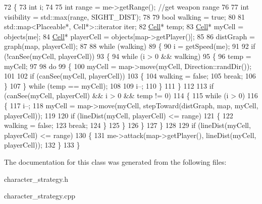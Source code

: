 \begin{DoxyCode}
72 \{
73     \textcolor{keywordtype}{int} i;
74 
75     \textcolor{keywordtype}{int} range = me->getRange(); \textcolor{comment}{//get weapon range}
76 
77     \textcolor{keywordtype}{int} visibility = std::max(range, SIGHT\_DIST);
78 
79     \textcolor{keywordtype}{bool} walking = \textcolor{keyword}{true};
80 
81     std::map<Placeable*, Cell*>::iterator iter;
82     \hyperlink{class_cell}{Cell}* temp;
83     \hyperlink{class_cell}{Cell}* myCell = objects[me];
84     \hyperlink{class_cell}{Cell}* playerCell = objects[map->getPlayer()];
85 
86     distGraph = graph(map, playerCell);
87 
88     \textcolor{keywordflow}{while} (walking)
89     \{
90         i = getSpeed(me);
91 
92         \textcolor{keywordflow}{if} (!canSee(myCell, playerCell))
93         \{
94             \textcolor{keywordflow}{while} (i > 0 && walking)
95             \{
96                 temp = myCell;
97 
98                 \textcolor{keywordflow}{do}
99                 \{
100                     myCell = map->move(myCell, Direction::randDir());
101 
102                     \textcolor{keywordflow}{if} (canSee(myCell, playerCell))
103                     \{
104                         walking = \textcolor{keyword}{false};
105                         \textcolor{keywordflow}{break};
106                     \}
107                 \} \textcolor{keywordflow}{while} (temp == myCell);
108 
109                 i--;
110             \}
111         \}
112 
113         \textcolor{keywordflow}{if} (canSee(myCell, playerCell) && i > 0 && temp != 0)
114         \{
115             \textcolor{keywordflow}{while} (i > 0)
116             \{
117                 i--;
118                 myCell = map->move(myCell, stepToward(distGraph, map, myCell, playerCell));
119                 
120                 \textcolor{keywordflow}{if} (lineDist(myCell, playerCell) <= range)
121                 \{
122                     walking = \textcolor{keyword}{false};
123                     \textcolor{keywordflow}{break};
124                 \}
125             \}
126         \}
127     \}
128 
129     \textcolor{keywordflow}{if} (lineDist(myCell, playerCell) <= range)
130     \{
131         me->attack(map->getPlayer(), lineDist(myCell, playerCell));
132     \}
133 \}
\end{DoxyCode}


The documentation for this class was generated from the following files\+:\begin{DoxyCompactItemize}
\item 
character\+\_\+strategy.\+h\item 
character\+\_\+strategy.\+cpp\end{DoxyCompactItemize}
